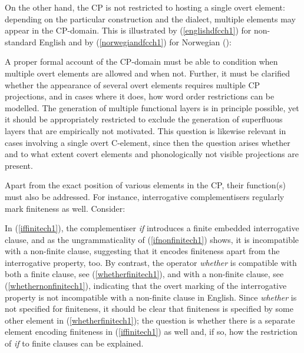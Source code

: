 On the other hand, the CP is not restricted to hosting a single overt element: depending on the particular construction and the dialect, multiple elements may appear in the CP-domain. This is illustrated by (\ref{englishdfcch1}) for non-standard English and by (\ref{norwegiandfcch1}) for Norwegian (\citealt[175]{bacskaiatkaribaudisch2018}):

\ea \label{dfcch1}
\z
\z

A proper formal account of the CP-domain must be able to condition when multiple overt elements are allowed and when not. Further, it must be clarified whether the appearance of several overt elements requires multiple CP projections, and in cases where it does, how word order restrictions can be modelled. The generation of multiple functional layers is in principle possible, yet it should be appropriately restricted to exclude the generation of superfluous layers that are empirically not motivated. This question is likewise relevant in cases involving a single overt C-element, since then the question arises whether and to what extent covert elements and phonologically not visible projections are present. 

Apart from the exact position of various elements in the CP, their function(s) must also be addressed. For instance, interrogative complementisers regularly mark finiteness as well. Consider:

\ea \label{ifwhetherch1}
\z
\z

In (\ref{iffinitech1}), the complementiser \textit{if} introduces a finite embedded interrogative clause, and as the ungrammaticality of (\ref{ifnonfinitech1}) shows, it is incompatible with a non-finite clause, suggesting that it encodes finiteness apart from the interrogative property, too. By contrast, the operator \textit{whether} is compatible with both a finite clause, see (\ref{whetherfinitech1}), and with a non-finite clause, see (\ref{whethernonfinitech1}), indicating that the overt marking of the interrogative property is not incompatible with a non-finite clause in English. Since \textit{whether} is not specified for finiteness, it should be clear that finiteness is specified by some other element in (\ref{whetherfinitech1}); the question is whether there is a separate element encoding finiteness in (\ref{iffinitech1}) as well and, if so, how the restriction of \textit{if} to finite clauses can be explained.

